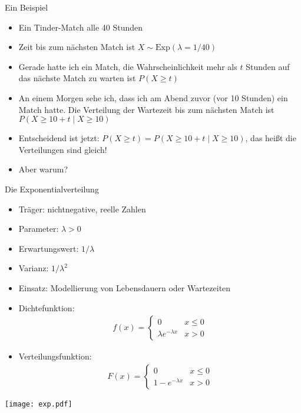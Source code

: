 \documentclass[t,11pt,aspectratio=169]{beamer}
\begin{document}
	
\begin{frame}{Ein Beispiel}
\begin{itemize}
	\item Ein Tinder-Match alle 40 Stunden
	\pause\item Zeit bis zum nächsten Match ist $X\sim\text{Exp}(\lambda=1/40)$
	\pause\item Gerade hatte ich ein Match, die Wahrscheinlichkeit mehr als $t$ Stunden auf das nächste Match zu warten ist $P(X\geq t)$
	\pause\item An einem Morgen sehe ich, dass ich am Abend zuvor (vor 10 Stunden) ein Match hatte. Die Verteilung der Wartezeit bis zum nächsten Match ist $P(X\geq 10+t \mid X\geq 10)$
	\pause\item Entscheidend ist jetzt: $P(X\geq t)=P(X\geq 10+t \mid X\geq 10)$, das heißt die Verteilungen sind gleich!
	\pause\item Aber warum?
\end{itemize}
\end{frame}

\begin{frame}{Die Exponentialverteilung}
\begin{itemize}
	\item Träger: nichtnegative, reelle Zahlen
	\item Parameter: $\lambda>0$
	\item Erwartungswert: $1/\lambda$
	\item Varianz: $1/\lambda^2$
	\item Einsatz: Modellierung von Lebensdauern oder Wartezeiten
	\pause \item Dichtefunktion: 
	\begin{align*}
		f(x)= \begin{cases}
			0 & x\leq 0 \\
			\lambda e^{-\lambda x} & x>0 
		\end{cases}
	\end{align*}
	\pause \item Verteilungsfunktion:
	\begin{align*}
	F(x)=\begin{cases}
		0 & x\leq 0 \\
		1-e^{-\lambda x} & x>0
	\end{cases}
	\end{align*}
\end{itemize}
\end{frame}

\begin{frame}
\begin{center}
	\texttt{[image: exp.pdf]}
\end{center}
\end{frame}
\end{document}
